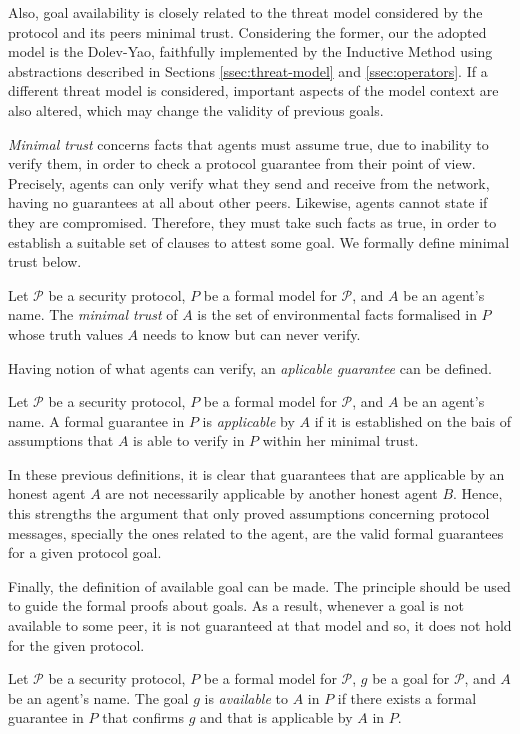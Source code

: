 Also, goal availability is closely related to the threat model considered by the protocol and its peers minimal trust. Considering the former, our the adopted model is the Dolev-Yao, faithfully implemented by the Inductive Method using abstractions described in Sections \ref{ssec:threat-model} and \ref{ssec:operators}. If a different threat model is considered, important aspects of the model context are also altered, which may change the validity of previous goals.

\textit{Minimal trust} concerns facts that agents must assume true, due to inability to verify them, in order to check a protocol guarantee from their point of view. Precisely, agents can only verify what they send and receive from the network, having no guarantees at all about other peers. Likewise, agents cannot state if they are compromised. Therefore, they must take such facts as true, in order to establish a suitable set of clauses to attest some goal. We formally define minimal trust below.

\begin{definition}
  Let $\mathcal{P}$ be a security protocol, $P$ be a formal model for $\mathcal{P}$, and $A$ be an agent's name. The \textit{minimal trust} of $A$ is the set of environmental facts formalised in $P$ whose truth values $A$ needs to know but can never verify.
\end{definition}

Having notion of what agents can verify, an \textit{aplicable guarantee} can be defined.

\begin{definition}
  Let $\mathcal{P}$ be a security protocol, $P$ be a formal model for $\mathcal{P}$, and $A$ be an agent's name. A formal guarantee in $P$ is \textit{applicable} by $A$ if it is established on the bais of assumptions that $A$ is able to verify in $P$ within her minimal trust.
\end{definition}

In these previous definitions, it is clear that guarantees that are applicable by an honest agent $A$ are not necessarily applicable by another honest agent $B$. Hence, this strengths the argument that only proved assumptions concerning protocol messages, specially the ones related to the agent, are the valid formal guarantees for a given protocol goal.

Finally, the definition of available goal can be made. The principle should be used to guide the formal proofs about goals. As a result, whenever a goal is not available to some peer, it is not guaranteed at that model and so, it does not hold for the given protocol.

\begin{definition}
  Let $\mathcal{P}$ be a security protocol, $P$ be a formal model for $\mathcal{P}$, $g$ be a goal for $\mathcal{P}$, and $A$ be an agent's name. The goal $g$ is \textit{available} to $A$ in $P$ if there exists a formal guarantee in $P$ that confirms $g$ and that is applicable by $A$ in $P$.
\end{definition}
